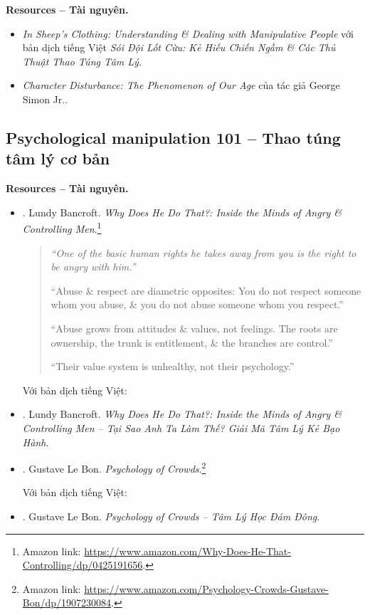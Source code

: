 \documentclass[12pt]{article}
\begin{document}
\noindent\textbf{\textsf{Resources -- Tài nguyên.}}
\begin{itemize}
	\item {\it In Sheep's Clothing: Understanding \& Dealing with Manipulative People} \cite{Simon2010} với bản dịch tiếng Việt {\it Sói Đội Lốt Cừu: Kẻ Hiếu Chiến Ngầm \& Các Thủ Thuật Thao Túng Tâm Lý}.
	\item {\it Character Disturbance: The Phenomenon of Our Age} \cite{Simon2011} của tác giả {\rm George Simon Jr.}.
\end{itemize}

\subsection{Psychological manipulation 101 -- Thao túng tâm lý cơ bản}
\textbf{\textsf{Resources -- Tài nguyên.}}
\begin{itemize}
	\item \cite{Bancroft_why_he_do}. {\sc Lundy Bancroft}. {\it Why Does He Do That?: Inside the Minds of Angry \& Controlling Men}.\footnote{Amazon link: \url{https://www.amazon.com/Why-Does-He-That-Controlling/dp/0425191656}.}
	\begin{quotation}\it
		``One of the basic human rights he takes away from you is the right to be angry with him.''
		
		``Abuse \& respect are diametric opposites: You do not respect someone whom you abuse, \& you do not abuse someone whom you respect.''
		
		``Abuse grows from attitudes \& values, not feelings. The roots are ownership, the trunk is entitlement, \& the branches are control.''
		
		``Their value system is unhealthy, not their psychology.''
	\end{quotation}
	Với bản dịch tiếng Việt:
	\item \cite{Bancroft_why_he_do_VN}. {\sc Lundy Bancroft}. {\it Why Does He Do That?: Inside the Minds of Angry \& Controlling Men -- Tại Sao Anh Ta Làm Thế? Giải Mã Tâm Lý Kẻ Bạo Hành}.
	\item \cite{Bon_crowd_psychology}. {\sc Gustave Le Bon}. {\it Psychology of Crowds}.\footnote{Amazon link: \url{https://www.amazon.com/Psychology-Crowds-Gustave-Bon/dp/1907230084}.}
	
	Với bản dịch tiếng Việt:
	\item \cite{Bon_crowd_psychology_VN}. {\sc Gustave Le Bon}. {\it Psychology of Crowds -- Tâm Lý Học Đám Đông}.
\end{itemize}
\end{document}
